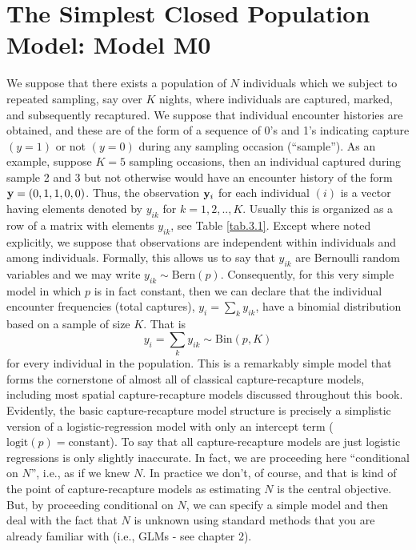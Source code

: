 \section{The Simplest Closed Population Model: Model M0}

We suppose that there exists a population of $N$ individuals which we
subject to repeated sampling, say over $K$ nights, where individuals
are captured, marked, and subsequently recaptured.  We suppose that
individual encounter histories are obtained, and these are of the form
of a sequence of 0's and 1's indicating capture $(y=1)$ or not $(y=0)$
during any sampling occasion (``sample'').  As an example, suppose
$K=5$ sampling occasions, then an individual captured during sample 2
and 3 but not otherwise would have an encounter history of the form
${\bf y}=(0,1,1,0,0)$. Thus, the observation ${\bf y}_{i}$ for each
individual $(i)$ is a vector having elements denoted by $y_{ik}$ for
$k=1,2,..,K$. Usually this is organized as a row of a matrix with
elements $y_{ik}$, see Table \ref{tab.3.1}.  Except where noted
explicitly, we suppose that observations are independent within
individuals and among individuals.  Formally, this allows us to say
that $y_{ik}$ are Bernoulli random variables and we may write $y_{ik}
\sim \mbox{Bern}(p)$.  Consequently, for this very simple model in
which $p$ is in fact constant, then we can declare that the individual
encounter frequencies (total captures), $y_{i} = \sum_{k} y_{ik}$,
have a binomial distribution based on a sample of size $K$. That is
\[
y_{i}  = \sum_{k} y_{ik} \sim \mbox{Bin}(p,K)
\]
for every individual in the population. This is a remarkably simple
model that forms the cornerstone of almost all of classical
capture-recapture models, including most spatial capture-recapture
models discussed throughout this book.  Evidently, the basic
capture-recapture model structure is precisely a simplistic version of
a logistic-regression model with only an intercept term
($\mbox{logit}(p) = \mbox{constant}$).  To say that all
capture-recapture models are just logistic regressions is only
slightly inaccurate. In fact, we are proceeding here ``conditional on
$N$'', i.e., as if we knew $N$. In practice we don't, of course, and
that is kind of the point of capture-recapture models as estimating
$N$ is the central objective. But, by proceeding conditional on $N$,
we can specify a simple model and then deal with the fact that $N$ is
unknown using standard methods that you are already familiar with
(i.e., GLMs - see chapter 2).
